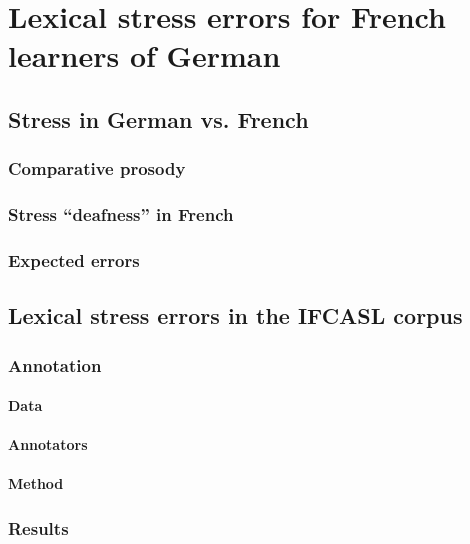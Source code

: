 %
%

\chapter{Lexical stress errors for French learners of German}


\blindtext
\section{Stress in German vs. French }
	\subsection{Comparative prosody}
	\subsection{Stress ``deafness'' in French}
	\subsection{Expected errors}
\section{Lexical stress errors in the IFCASL corpus} 
	\subsection{Annotation}
		\subsubsection{Data}
		\subsubsection{Annotators}
		\subsubsection{Method}
	\subsection{Results}

